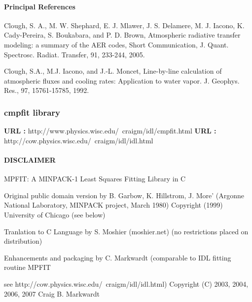 \paragraph*{Principal References}

Clough, S. A., M. W. Shephard, E. J. Mlawer, J. S. Delamere, M. J. Iacono, K.
Cady-Pereira, S. Boukabara, and P. D. Brown, Atmospheric radiative transfer
modeling: a summary of the AER codes, Short Communication, J. Quant. Spectrosc.
Radiat. Transfer, 91, 233-244, 2005.

Clough, S.A., M.J. Iacono, and J.-L. Moncet, Line-by-line calculation of
atmospheric fluxes and cooling rates: Application to water vapor. J. Geophys.
Res., 97, 15761-15785, 1992.


\subsubsection{cmpfit library}
{\bf  URL :} http://www.physics.wisc.edu/~craigm/idl/cmpfit.html
{\bf  URL :} http://cow.physics.wisc.edu/~craigm/idl/idl.html

\paragraph*{DISCLAIMER}

MPFIT: A MINPACK-1 Least Squares Fitting Library in C

Original public domain version by B. Garbow, K. Hillstrom, J. More'
  (Argonne National Laboratory, MINPACK project, March 1980)
  Copyright (1999) University of Chicago
    (see below)

Tranlation to C Language by S. Moshier (moshier.net)
  (no restrictions placed on distribution)

Enhancements and packaging by C. Markwardt
  (comparable to IDL fitting routine MPFIT

   see http://cow.physics.wisc.edu/~craigm/idl/idl.html)
  Copyright (C) 2003, 2004, 2006, 2007 Craig B. Markwardt

